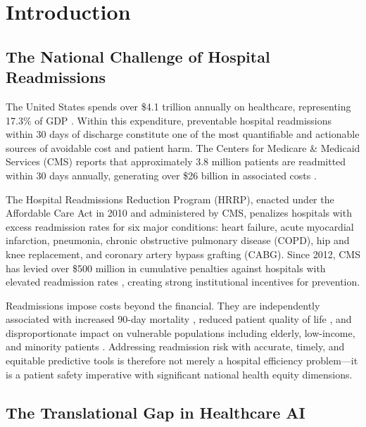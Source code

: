 \documentclass[11pt,letterpaper]{article}
\begin{document}
\vspace{1em}

\section{Introduction}

\subsection{The National Challenge of Hospital Readmissions}

The United States spends over \$4.1 trillion annually on healthcare, representing 17.3\% of GDP \citep{cms_nhe_2023}. Within this expenditure, preventable hospital readmissions within 30 days of discharge constitute one of the most quantifiable and actionable sources of avoidable cost and patient harm. The Centers for Medicare \& Medicaid Services (CMS) reports that approximately 3.8 million patients are readmitted within 30 days annually, generating over \$26 billion in associated costs \citep{jencks2009rehospitalizations}.

The Hospital Readmissions Reduction Program (HRRP), enacted under the Affordable Care Act in 2010 and administered by CMS, penalizes hospitals with excess readmission rates for six major conditions: heart failure, acute myocardial infarction, pneumonia, chronic obstructive pulmonary disease (COPD), hip and knee replacement, and coronary artery bypass grafting (CABG). Since 2012, CMS has levied over \$500 million in cumulative penalties against hospitals with elevated readmission rates \citep{cms_hrrp_2023}, creating strong institutional incentives for prevention.

Readmissions impose costs beyond the financial. They are independently associated with increased 90-day mortality \citep{dharmarajan2013diagnoses}, reduced patient quality of life \citep{desai2016readmissions}, and disproportionate impact on vulnerable populations including elderly, low-income, and minority patients \citep{herrin2015community}. Addressing readmission risk with accurate, timely, and equitable predictive tools is therefore not merely a hospital efficiency problem---it is a patient safety imperative with significant national health equity dimensions.

\subsection{The Translational Gap in Healthcare AI}
\end{document}
